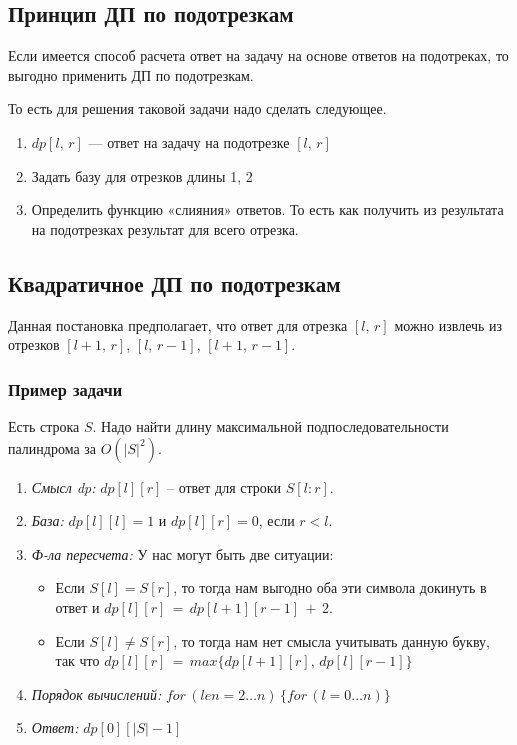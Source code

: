 \subsection*{Принцип ДП по подотрезкам}

Если имеется способ расчета ответ на задачу на основе ответов на подотреках, то выгодно применить ДП по подотрезкам.

То есть для решения таковой задачи надо сделать следующее.

\begin{enumerate}
    \item $dp[l,\,r]$ — ответ на задачу на подотрезке $[l,\,r]$
    \item Задать базу для отрезков длины 1, 2
    \item Определить функцию «слияния» ответов. То есть как получить из результата на подотрезках результат для всего отрезка.
\end{enumerate}

\subsection*{Квадратичное ДП по подотрезкам}

Данная постановка предполагает, что ответ для отрезка $[l,\,r]$ можно извлечь из отрезков $[l + 1,\,r]$, $[l,\,r - 1]$, $[l + 1,\,r - 1]$.

\subsubsection*{Пример задачи}

Есть строка $S$. Надо найти длину максимальной подпоследовательности палиндрома за $O(|S|^2)$.

\Solve

\begin{enumerate}
    \item \textit{Смысл dp:} $dp[l][r]$ -- ответ для строки $S[l:r]$.
    \item \textit{База:} $dp[l][l] = 1$ и $dp[l][r] = 0$, если $r < l$.
    \item \textit{Ф-ла пересчета:} У нас могут быть две ситуации:
    \begin{itemize}
        \item Если $S[l] = S[r]$, то тогда нам выгодно оба эти символа докинуть в ответ и $dp[l][r]\,=\,dp[l + 1][r - 1]\,+\,2$.
        \item Если $S[l] \neq S[r]$, то тогда нам нет смысла учитывать данную букву, так что $dp[l][r]\,=\,max \{ dp[l + 1][r],\,dp[l][r - 1] \}$
    \end{itemize}
    \item \textit{Порядок вычислений:} $for\,(len=2 \dots n)\, \{ for\,(l = 0 \dots n) \}$
    \item \textit{Ответ:} $dp[0][|S| - 1]$
\end{enumerate}

